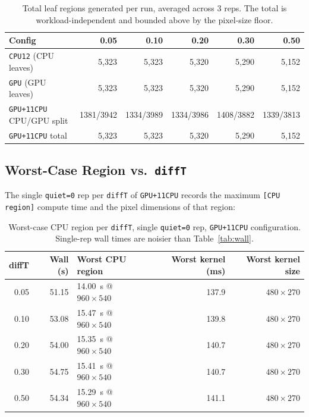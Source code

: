 \documentclass[
	english,
	letterpaper, oneside
]{article}
\begin{document}
\begin{table}[H]
    \centering
    \caption{Total leaf regions generated per run, averaged across 3
             reps. The total is workload-independent and bounded above
             by the pixel-size floor.}
    \label{tab:leaves}
    \begin{tabular}{lrrrrr}
        \hline
        Config & 0.05 & 0.10 & 0.20 & 0.30 & 0.50 \\
        \hline
        \texttt{CPU12} (CPU leaves)        & 5{,}323 & 5{,}323 & 5{,}320 & 5{,}290 & 5{,}152 \\
        \texttt{GPU} (GPU leaves)          & 5{,}323 & 5{,}323 & 5{,}320 & 5{,}290 & 5{,}152 \\
        \texttt{GPU+11CPU} CPU/GPU split   & 1381/3942 & 1334/3989 & 1334/3986 & 1408/3882 & 1339/3813 \\
        \texttt{GPU+11CPU} total           & 5{,}323 & 5{,}323 & 5{,}320 & 5{,}290 & 5{,}152 \\
        \hline
    \end{tabular}
\end{table}

\subsection{Worst-Case Region vs.\ \texttt{diffT}}

The single \texttt{quiet=0} rep per \texttt{diffT} of \texttt{GPU+11CPU}
records the maximum \texttt{[CPU region]} compute time and the pixel
dimensions of that region:

\begin{table}[H]
    \centering
    \caption{Worst-case CPU region per \texttt{diffT}, single \texttt{quiet=0}
             rep, \texttt{GPU+11CPU} configuration. Single-rep wall
             times are noisier than Table~\ref{tab:wall}.}
    \label{tab:worst}
    \begin{tabular}{rrlrr}
        \hline
        diffT & Wall (s) & Worst CPU region & Worst kernel (ms) & Worst kernel size \\
        \hline
        0.05 & 51.15 & 14.00~s @ $960\times540$ & 137.9 & $480\times270$ \\
        0.10 & 53.08 & 15.47~s @ $960\times540$ & 139.8 & $480\times270$ \\
        0.20 & 54.00 & 15.35~s @ $960\times540$ & 140.7 & $480\times270$ \\
        0.30 & 54.75 & 15.41~s @ $960\times540$ & 140.7 & $480\times270$ \\
        0.50 & 54.34 & 15.29~s @ $960\times540$ & 141.1 & $480\times270$ \\
        \hline
    \end{tabular}
\end{table}
\end{document}
